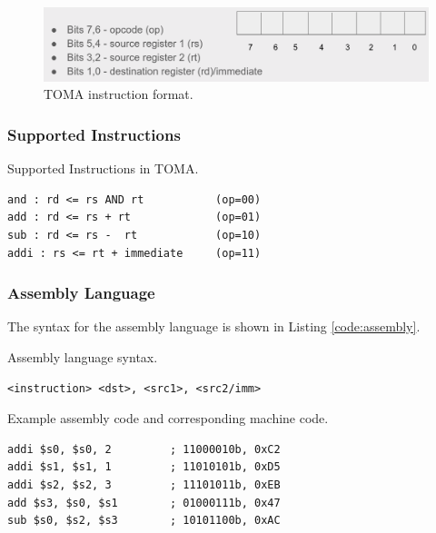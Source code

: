 \documentclass[a4paper, 11pt,oneside]{article}
\begin{document}
\begin{figure}[H]
	\begin{center}
	\includegraphics[width=4.5in]{ins_format.png}
	\caption{TOMA instruction format.}
	\label{fig:ins_format} 
	\end{center}
\end{figure}

\subsubsection{Supported Instructions}
\begin{listing}[H]
\caption{Supported Instructions in TOMA.}
\label{code:instructions}
\begin{verbatim}
and : rd <= rs AND rt           (op=00)
add : rd <= rs + rt             (op=01)
sub : rd <= rs -  rt            (op=10)
addi : rs <= rt + immediate     (op=11)
\end{verbatim}
\end{listing}


\subsubsection{Assembly Language}
\label{marker:assembly}

The syntax for the assembly language is shown in Listing \ref{code:assembly}.

\begin{listing}[H]
\caption{Assembly language syntax.}
\label{code:assembly}
\begin{verbatim}
<instruction> <dst>, <src1>, <src2/imm>
\end{verbatim}
\end{listing}


\begin{listing}[H]
\caption{Example assembly code and corresponding machine code.}
\label{code:assembly_sample}
\begin{verbatim}
addi $s0, $s0, 2         ; 11000010b, 0xC2
addi $s1, $s1, 1         ; 11010101b, 0xD5
addi $s2, $s2, 3         ; 11101011b, 0xEB
add $s3, $s0, $s1        ; 01000111b, 0x47
sub $s0, $s2, $s3        ; 10101100b, 0xAC
\end{verbatim}
\end{listing}
\end{document}

